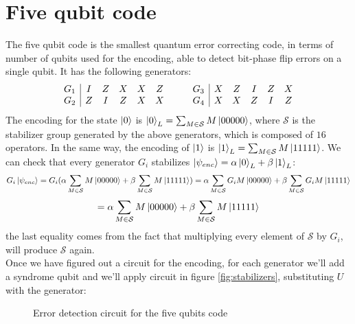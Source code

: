 \documentclass{article}
\begin{document}
	 \section{Five qubit code}
	 The five qubit code is the smallest quantum error correcting code, in terms of number of qubits used for the encoding, able to detect bit-phase flip errors on a single qubit. It has the following generators:
	 \[
	 \begin{array}{c|c c c c c}
	 	G_1 & I & Z & X & X & Z\\
	 	G_2 & Z & I & Z & X & X
	 \end{array}\qquad
	 \begin{array}{c|c c c c c}
	 	G_3 & X & Z & I & Z & X\\
	 	G_4 & X & X & Z & I & Z
	 \end{array}
	 \]
	 The encoding for the state $\ket{0}$ is $\ket{0}_L = \sum_{M \in \mathcal{S}}M\ket{00000}$, where $\mathcal{S}$ is the stabilizer group generated by the above generators, which is composed of $16$ operators. In the same way, the encoding of $\ket{1}$ is $\ket{1}_L = \sum_{M \in \mathcal{S}}M\ket{11111}$. We can check that every generator $G_i$ stabilizes $\ket{\psi_{enc}} = \alpha\ket{0}_L + \beta\ket{1}_L$:
	 \[ G_i\ket{\psi_{enc}} = G_i(\alpha\sum_{M \in \mathcal{S}}M\ket{00000} + \beta\sum_{M \in \mathcal{S}}M\ket{11111}) = \alpha\sum_{M \in \mathcal{S}}G_iM\ket{00000} + \beta\sum_{M \in \mathcal{S}}G_iM\ket{11111} \]
	 \[  = \alpha\sum_{M \in \mathcal{S}}M\ket{00000} + \beta\sum_{M \in \mathcal{S}}M\ket{11111} \]
	 the last equality comes from the fact that multiplying every element of $\mathcal{S}$ by $G_i$, will produce $\mathcal{S}$ again.\\
	 Once we have figured out a circuit for the encoding, for each generator we'll add a syndrome qubit and we'll apply circuit in figure \ref{fig:stabilizers}, substituting $U$ with the generator: 
	 \begin{figure}[H]
	 	\centering
 		\caption{Error detection circuit for the five qubits code}
	\end{figure}
\end{document}
